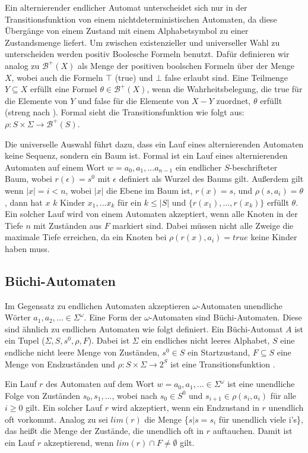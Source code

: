 Ein alternierender endlicher Automat unterscheidet sich nur in der Transitionsfunktion von einem nichtdeterministischen Automaten, da diese Übergänge von einem Zustand mit einem Alphabetsymbol zu einer Zustandsmenge liefert. Um zwischen existenzieller und universeller Wahl zu unterscheiden werden positiv Boolesche Formeln benutzt. Dafür definieren wir analog zu \cite{vardi+96} $\mathcal{B}^+(X)$ als Menge der positiven boolschen Formeln über der Menge $X$, wobei auch die Formeln $\top$ (true) und $\bot$ false erlaubt sind. Eine Teilmenge $Y \subseteq X$ erfüllt eine Formel $\theta \in \mathcal{B}^+(X)$, wenn die Wahrheitsbelegung, die true für die Elemente von $Y$ und false für die Elemente von $X-Y$ zuordnet, $\theta$ erfüllt (streng nach \cite{vardi+96}). Formal sieht die Transitionsfunktion wie folgt aus: $\rho: S \times \Sigma \rightarrow \mathcal{B}^+(S)$. 

Die universelle Auswahl führt dazu, dass ein Lauf eines alternierenden Automaten keine Sequenz, sondern ein Baum ist. Formal ist ein Lauf eines alternierenden Automaten auf einem Wort $w=a_0,a_1,...a_{n-1}$ ein endlicher $S$-beschrifteter Baum, wobei $r(\epsilon)=s^0$ mit $\epsilon$ definiert als Wurzel des Baums gilt. Außerdem gilt wenn $|x|=i<n$, wobei $|x|$ die Ebene im Baum ist, $r(x)=s$, und $\rho(s,a_i)=\theta$, dann hat $x$ $k$ Kinder $x_1,...x_k$ für ein $k\leq|S|$ und $\{r(x_1),...,r(x_k)\}$ erfüllt $\theta$. Ein solcher Lauf wird von einem Automaten akzeptiert, wenn alle Knoten in der Tiefe $n$ mit Zuständen aus $F$ markiert sind. Dabei müssen nicht alle Zweige die maximale Tiefe erreichen, da ein Knoten bei $\rho(r(x),a_i)=true$ keine Kinder haben muss.

\subsection{Büchi-Automaten}
Im Gegensatz zu endlichen Automaten akzeptieren $\omega$-Automaten unendliche Wörter \linebreak $a_1,a_2,...\in\Sigma^{\omega}$. Eine Form der $\omega$-Automaten sind Büchi-Automaten. Diese sind ähnlich zu endlichen Automaten wie folgt definiert. Ein Büchi-Automat $A$ ist ein Tupel ($\Sigma, S, s^0, \rho, F$). Dabei ist $\Sigma$ ein endliches nicht leeres Alphabet, $S$ eine endliche nicht leere Menge von Zuständen, $s^0\in S$ ein Startzustand, $F\subseteq S$ eine Menge von Endzuständen und $\rho : S \times \Sigma \rightarrow 2^S$ ist eine Transitionsfunktion \cite{hofmann11,vardi+96}.

Ein Lauf $r$ des Automaten auf dem Wort $w=a_0,a_1,... \in \Sigma^{\omega}$ ist eine unendliche Folge von Zuständen $s_0,s_1,...$, wobei nach \cite{vardi+96} $s_0 \in S^0$ und $s_{i+1} \in \rho(s_i, a_i)$ für alle $i \geq 0$ gilt. Ein solcher Lauf $r$ wird akzeptiert, wenn ein Endzustand in $r$ unendlich oft vorkommt. Analog zu \cite{vardi+96} sei $lim(r)$ die Menge \{$s|s=s_i$ für unendlich viele i's\}, das heißt die Menge der Zustände, die unendlich oft in $r$ auftauchen. Damit ist ein Lauf $r$ akzeptierend, wenn $lim(r)\cap F \neq \emptyset$ gilt.

